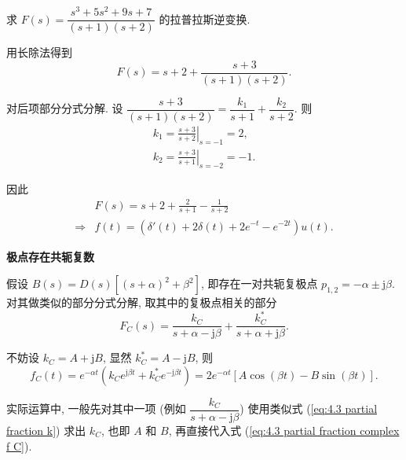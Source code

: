 \begin{exampleprob}
    求 $F(s)=\dfrac{s^3+5s^2+9s+7}{(s+1)(s+2)}$ 的拉普拉斯逆变换.

    \begin{solution}
        用长除法得到
        \begin{equation*}
            F(s)=s+2+\frac{s+3}{(s+1)(s+2)}.
        \end{equation*}

        对后项部分分式分解. 设 $\dfrac{s+3}{(s+1)(s+2)}=\dfrac{k_1}{s+1}+\dfrac{k_2}{s+2}$. 则
        \begin{gather*}
            k_1=\left.\frac{s+3}{s+2}\right|_{s=-1}=2, \\
            k_2=\left.\frac{s+3}{s+1}\right|_{s=-2}=-1.
        \end{gather*}

        因此
        \begin{align*}
                        & F(s)=s+2+\frac{2}{s+1}-\frac{1}{s+2}              \\
            \Rightarrow & f(t)=(\delta'(t)+2\delta(t)+2e^{-t}-e^{-2t})u(t).
        \end{align*}
    \end{solution}
\end{exampleprob}

\textbf{极点存在共轭复数}

假设 $B(s)=D(s)[(s+\alpha)^2+\beta^2]$, 即存在一对共轭复极点 $p_{1,2}=-\alpha\pm\mathrm{j}\beta$. 对其做类似的部分分式分解, 取其中的复极点相关的部分
\begin{equation}
    F_C(s)=\frac{k_C}{s+\alpha-\mathrm{j}\beta}+\frac{k_C^*}{s+\alpha+\mathrm{j}\beta}.
\end{equation}

不妨设 $k_C=A+\mathrm{j}B$, 显然 $k_C^*=A-\mathrm{j}B$, 则
\begin{equation} \label{eq:4.3 partial fraction complex f C}
    f_C(t)=e^{-\alpha t}(k_Ce^{\mathrm{j}\beta t}+k_C^* e^{-\mathrm{j}\beta t})=2e^{-\alpha t}[A\cos(\beta t)-B\sin(\beta t)].
\end{equation}

实际运算中, 一般先对其中一项 (例如 $\dfrac{k_C}{s+\alpha-\mathrm{j}\beta}$) 使用类似式 (\ref{eq:4.3 partial fraction k}) 求出 $k_C$, 也即 $A$ 和 $B$, 再直接代入式 (\ref{eq:4.3 partial fraction complex f C}).

